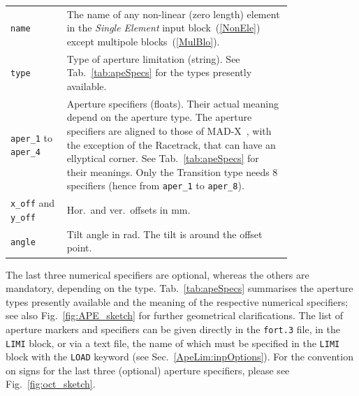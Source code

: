 \begin{longtabu}{@{}lp{0.8\linewidth}}
    \texttt{name}   & The name of any non-linear (zero length) element in the \textit{Single Element} input block~(\ref{NonEle}) except multipole blocks~(\ref{MulBlo}). \\
    \texttt{type}   & Type of aperture limitation (string). See Tab.~\ref{tab:apeSpecs} for the types
                      presently available. \\
    \texttt{aper\_1} to \texttt{aper\_4}  & Aperture specifiers (floats).
                      Their actual meaning depend on the aperture type. The aperture specifiers are
                      aligned to those of MAD-X~\cite{MAD}, with the exception of the Racetrack,
                      that can have an ellyptical corner. See Tab.~\ref{tab:apeSpecs} for their
                      meanings. Only the Transition type needs 8 specifiers (hence from \texttt{aper\_1} to \texttt{aper\_8}). \\
    \texttt{x\_off} and \texttt{y\_off}  & Hor.~and ver.~offsets in mm. \\
    \texttt{angle}  & Tilt angle in rad. The tilt is around the offset point.\\
\end{longtabu}

The last three numerical specifiers are optional, whereas the others are mandatory, depending on the type.
Tab.~\ref{tab:apeSpecs} summarises the aperture types presently available and the meaning of the respective numerical specifiers; see also Fig.~\ref{fig:APE_sketch} for further geometrical clarifications.
The list of aperture markers and specifiers can be given directly in the \texttt{fort.3} file, in the \texttt{LIMI} block, or via a text file, the name of which must be specified in the \texttt{LIMI} block with the \texttt{LOAD} keyword (see Sec.~\ref{ApeLim:inpOptions}).
For the convention on signs for the last three (optional) aperture specifiers, please see Fig.~\ref{fig:oct_sketch}.


